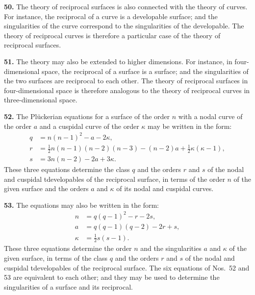 \documentclass[11pt,a4paper]{article}
\begin{document}
\textbf{50.} The theory of reciprocal surfaces is also connected with the theory of curves. For instance, the reciprocal of a curve is a developable surface; and the singularities of the curve correspond to the singularities of the developable. The theory of reciprocal curves is therefore a particular case of the theory of reciprocal surfaces.

\textbf{51.} The theory may also be extended to higher dimensions. For instance, in four-dimensional space, the reciprocal of a surface is a surface; and the singularities of the two surfaces are reciprocal to each other. The theory of reciprocal surfaces in four-dimensional space is therefore analogous to the theory of reciprocal curves in three-dimensional space.

\textbf{52.} The Pl\"uckerian equations for a surface of the order $n$ with a nodal curve of the order $a$ and a cuspidal curve of the order $\kappa$ may be written in the form:
\begin{align*}
q &= n(n-1)^2 - a - 2\kappa, \\
r &= \tfrac{1}{2}n(n-1)(n-2)(n-3) - (n-2)a + \tfrac{1}{2}\kappa(\kappa-1), \\
s &= 3n(n-2) - 2a + 3\kappa.
\end{align*}
These three equations determine the class $q$ and the orders $r$ and $s$ of the nodal and cuspidal tdevelopables of the reciprocal surface, in terms of the order $n$ of the given surface and the orders $a$ and $\kappa$ of its nodal and cuspidal curves.

\textbf{53.} The equations may also be written in the form:
\begin{align*}
n &= q(q-1)^2 - r - 2s, \\
a &= q(q-1)(q-2) - 2r + s, \\
\kappa &= \tfrac{1}{2}s(s-1).
\end{align*}
These three equations determine the order $n$ and the singularities $a$ and $\kappa$ of the given surface, in terms of the class $q$ and the orders $r$ and $s$ of the nodal and cuspidal tdevelopables of the reciprocal surface. The six equations of Nos.~52 and 53 are equivalent to each other; and they may be used to determine the singularities of a surface and its reciprocal.
\end{document}
